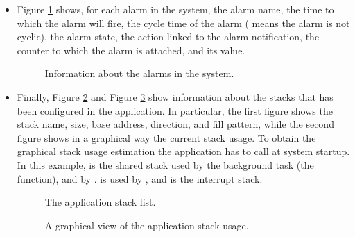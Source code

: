 \begin{itemize}
\item Figure \ref{fig:trace32_alarm} shows, for each alarm in the
  system, the alarm name, the time to which the alarm will fire, the
  cycle time of the alarm ( means the alarm is not cyclic),
  the alarm state, the action linked to the alarm notification, the
  counter to which the alarm is attached, and its value.
%
\begin{figure}
\caption{\label{fig:trace32_alarm} Information about the alarms in the
system.}
\end{figure}
%

\item Finally, Figure \ref{fig:trace32_stack} and Figure
  \ref{fig:trace32_stackview} show information about the stacks that
  has been configured in the application. In particular, the first
  figure shows the stack name, size, base address, direction, and fill
  pattern, while the second figure shows in a graphical way the
  current stack usage. To obtain the graphical stack usage estimation
  the application has to call  at system
  startup. In this example,  is the shared stack used by
  the background task (the  function), and by
  .  is used by , and  is
  the interrupt stack.
%
\begin{figure}
\caption{\label{fig:trace32_stack} The application stack list.}
\end{figure}
%
\begin{figure}
\caption{\label{fig:trace32_stackview} A graphical view of the
application stack usage.}
\end{figure}

\end{itemize}



